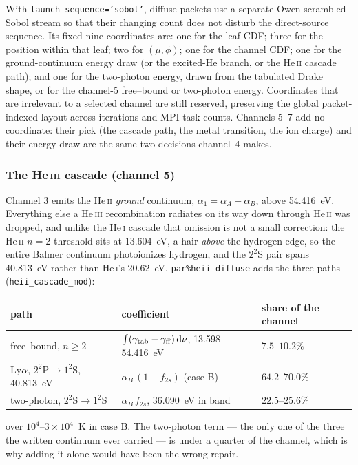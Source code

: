 \documentclass[english,a4paper]{my_memo}
\newcommand{\code}[1]{\texttt{#1}}
\begin{document}
With \code{launch\_sequence='sobol'}, diffuse packets use a separate
Owen-scrambled Sobol stream so that their changing count does not disturb
the direct-source sequence.  Its fixed nine coordinates are: one for the
leaf CDF; three for the position within that leaf; two for $(\mu,\phi)$;
one for the channel CDF; one for the ground-continuum energy draw (or
the excited-He branch, or the He\,\textsc{ii} cascade path); and one for the
two-photon energy, drawn from the tabulated Drake shape, or for the
channel-5 free--bound or two-photon energy.  Coordinates that are irrelevant
to a selected channel
are still reserved, preserving the global packet-indexed layout across
iterations and MPI task counts.  Channels 5--7 add no coordinate: their
pick (the cascade path, the metal transition, the ion charge) and their
energy draw are the same two decisions channel~4 makes.

\subsubsection{The He\,\textsc{iii} cascade (channel 5)}
\label{sec:heiicascade}
Channel 3 emits the He\,\textsc{ii} \emph{ground} continuum,
$\alpha_1 = \alpha_A - \alpha_B$, above 54.416~eV.  Everything else a
He\,\textsc{iii} recombination radiates on its way down through He\,\textsc{ii}
was dropped, and unlike the He\,\textsc{i} cascade that omission is not a
small correction: the He\,\textsc{ii} $n=2$ threshold sits at 13.604~eV, a
hair \emph{above} the hydrogen edge, so the entire Balmer continuum
photoionizes hydrogen, and the $2^2$S pair spans 40.813~eV rather than
He\,\textsc{i}'s 20.62~eV.  \code{par\%heii\_diffuse} adds the three paths
(\code{heii\_cascade\_mod}):
\begin{center}
\begin{tabular}{lll}
\toprule
path & coefficient & share of the channel \\
\midrule
free--bound, $n\ge2$ & $\int(\gamma_{\rm tab} - \gamma_{\rm ff})\,
  {\rm d}\nu$, 13.598--54.416~eV & $7.5$--$10.2\%$ \\
Ly$\alpha$, $2^2$P$\rightarrow1^2$S, 40.813~eV &
  $\alpha_B\,(1-f_{2s})$ (case B) & $64.2$--$70.0\%$ \\
two-photon, $2^2$S$\rightarrow1^2$S & $\alpha_B\,f_{2s}$, 36.090~eV in band &
  $22.5$--$25.6\%$ \\
\bottomrule
\end{tabular}
\end{center}
over $10^4$--$3{\times}10^4$~K in case B.  The two-photon term --- the only one of the
three the written continuum ever carried --- is under a quarter of the
channel, which is why adding it alone would have been the wrong repair.
\end{document}

